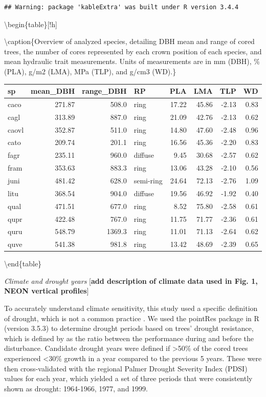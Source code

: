 \documentclass[]{article}
\begin{document}
\begin{verbatim}
## Warning: package 'kableExtra' was built under R version 3.4.4
\end{verbatim}

\textbackslash{}begin\{table\}{[}!h{]}

\textbackslash{}caption\{\label{tab:Table2}Overview of analyzed species,
detailing DBH mean and range of cored trees, the number of cores
represented by each crown position of each species, and mean hydraulic
trait measurements. Units of measurements are in mm (DBH), \% (PLA),
g/m2 (LMA), MPa (TLP), and g/cm3 (WD).\} \centering

\begin{tabular}{lrrlrrrr}
\toprule
sp & mean\_DBH & range\_DBH & RP & PLA & LMA & TLP & WD\\
\midrule
caco & 271.87 & 508.0 & ring & 17.22 & 45.86 & -2.13 & 0.83\\
cagl & 313.89 & 887.0 & ring & 21.09 & 42.76 & -2.13 & 0.62\\
caovl & 352.87 & 511.0 & ring & 14.80 & 47.60 & -2.48 & 0.96\\
cato & 209.74 & 201.1 & ring & 16.56 & 45.36 & -2.20 & 0.83\\
fagr & 235.11 & 960.0 & diffuse & 9.45 & 30.68 & -2.57 & 0.62\\
\addlinespace
fram & 353.63 & 883.3 & ring & 13.06 & 43.28 & -2.10 & 0.56\\
juni & 481.42 & 628.0 & semi-ring & 24.64 & 72.13 & -2.76 & 1.09\\
litu & 368.54 & 904.0 & diffuse & 19.56 & 46.92 & -1.92 & 0.40\\
qual & 471.51 & 677.0 & ring & 8.52 & 75.80 & -2.58 & 0.61\\
qupr & 422.48 & 767.0 & ring & 11.75 & 71.77 & -2.36 & 0.61\\
\addlinespace
quru & 548.79 & 1369.3 & ring & 11.01 & 71.13 & -2.64 & 0.62\\
quve & 541.38 & 981.8 & ring & 13.42 & 48.69 & -2.39 & 0.65\\
\bottomrule
\end{tabular}

\textbackslash{}end\{table\}

\emph{Climate and drought years} {[}\textbf{add description of climate
data used in Fig. 1, NEON vertical profiles}{]}

To accurately understand climate sensitivity, this study used a specific
definition of drought, which is not a common practice
\citep{slette_how_2019}. We used the pointRes package \citep{R-pointRes}
in R (version 3.5.3) to determine drought periods based on trees'
drought resistance, which is defined by \citep{lloret_components_2011}
as the ratio between the performance during and before the disturbance.
Candidate drought years were defined if \textgreater{}50\% of the cored
trees experienced \textless{}30\% growth in a year compared to the
previous 5 years. These were then cross-validated with the regional
Palmer Drought Severity Index (PDSI) values for each year, which yielded
a set of three periods that were consistently shown as drought:
1964-1966, 1977, and 1999.
\end{document}
